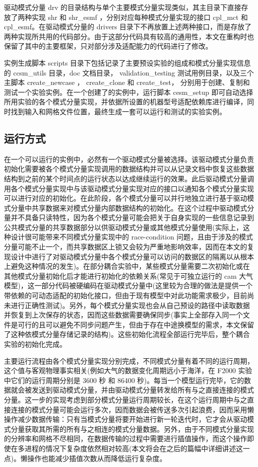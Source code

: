 驱动模式分量 drv 的目录结构与单个主要模式分量实现类似，其主目录下直接存放了两种实现 shr 和 shr\_esmf ，分别对应每种模式分量实现的接口 cpl\_mct 和 cpl\_esmf。在驱动模式分量的 drivers 目录下不再放置上述两种接口，而是存放了两种实现所共用的代码部分。由于这部分代码具有较高的通用性，本文在重构时也保留了其中的主要框架，只对部分涉及适配能力的代码进行了修改。

实例生成脚本 scripts 目录下包括记录了主要预设实验的组成和模式分量实现信息的 ccsm\_utils 目录，doc 文档目录， validation\_testing 测试用例目录，以及三个主脚本 create\_newcase ， create\_clone 和 create\_test， 分别用于创建、复制和测试一个实验实例。在一个创建了的实例中，运行脚本 cesm\_setup 即可自动选择所用实验的各个模式分量实现，并依据所设置的机器型号适配依赖库进行编译，同时找到输入和网格文件位置，最终生成一套可以运行和测试的实验实例。

\subsection{运行方式}

在一个可以运行的实例中，必然有一个驱动模式分量被选择。该驱动模式分量负责初始化需要被各个模式分量实现调用的数据结构并可以从记录文档中恢复这些数据结构到之前的某个时间点的运行状态以达成继续运行的效果。此后驱动模式分量调用各个模式分量实现中与该驱动模式分量实现对应的接口以通知各个模式分量实现可以进行对应的初始化。在此阶段，各个模式分量可以并行地独立进行基于驱动模式分量中共享数据来对模式分量内部数据结构的初始化。在这个过程中驱动模式分量并不具备只读特性，因为各个模式分量可能会把关于自身实现的一些信息记录到公共模式分量的共享数据部分以供驱动模式分量或其他模式分量使用(实际上，这种设计很可能带来不同模式分量实现中的 race-condition 问题，且由于涉及的模式分量可能不止一个，而共享数据区上锁又会较为严重地影响效率，因而在本文的复现设计中进行了对驱动模式分量中各个模式分量可以访问的数据区的隔离以从根本上避免这种情况的发生)。在部分耦合实验中，某些模式分量需要二次初始化或在其他模式分量初始化后才能进行初始化的依赖关系(常见于可独立运行的 cam 大气模型)，这一部分代码被硬编码在驱动模式分量中(这里较为合理的做法是提供一个带依赖的可动态适配的初始化接口，但由于现有模型中对此功能需求极少，目前尚未进行正确性测试)。另外，每个模式分量实现也会从自己预设的路径中读取数据并恢复到上次保存的状态，因而这些数据需要确保同步(事实上全部存入同一个文件是可行的且可以避免不同步问题产生，但由于存在中途换模型的需求，本文保留了这种依模式分量存储记录的结构)。这些初始化流程全部运行完毕后，整个耦合实验的初始化完成。

主要运行流程由各个模式分量实现分别完成，不同模式分量有着不同的运行周期，这个值与客观物理事实相关(例如大气的数据变化周期远小于海洋，在 F2000 实验中它们的运行周期分别是 3600 秒 和 86400 秒)。每当一个模型运行完毕，它的数据就会被发送到驱动模式分量，并由驱动模式分量转发给所有与之直接连接的模式分量。这一步的实现考虑到部分模式分量运行周期较长，在这个运行周期中与之直接连接的模式分量可能会运行多次，因而数据会被传送多次引起浪费，因而采用懒操作减少数据传输：只有当模式分量将要开始进行新一轮迭代时，它才会从驱动模式分量获取其所需的所有与之相连的模式分量数据。另外，由于不同模式分量实现的分辨率和网格不尽相同，在数据传输的过程中需要进行插值操作，而这个操作即使在多进程的情况下复杂度依然相对较高(本文将会在之后的篇幅中详细讲述这一点)。懒操作也能减少插值次数从而降低运行复杂度。


